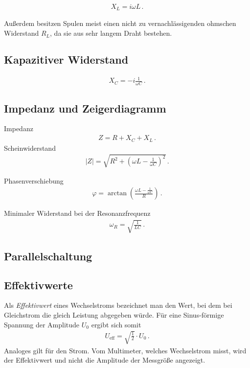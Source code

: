 \documentclass[12pt,a4paper,titlepage,headinclude,bibtotoc]{scrartcl}
\begin{document}
\begin{align}
	X_L=i\omega L \,.
\end{align}

Außerdem besitzen Spulen meist einen nicht zu vernachlässigenden ohmschen Widerstand $R_L$, da sie aus sehr langem Draht bestehen.

\subsection{Kapazitiver Widerstand}

\begin{align}
	X_C=-i\frac{1}{\omega C} \,.
\end{align}

\subsection{Impedanz und Zeigerdiagramm}
Impedanz
\begin{align}
	Z=R+X_C+X_L \,.
\end{align}
Scheinwiderstand
\begin{align}
	|Z|=\sqrt{R^2+\left(\omega L - \frac{1}{\omega C}\right)^2} \,.
\end{align}

Phasenverschiebung
\begin{align}
	\varphi=\arctan\left(\frac{\omega L - \frac{1}{\omega C}}{R} \right) \,.
	\label{eq:phase_serie}
\end{align}

Minimaler Widerstand bei der Resonanzfrequenz
\begin{align}
	\omega_R=\sqrt{\frac{1}{LC}} \,.
\end{align}

\subsection{Parallelschaltung}

\subsection{Effektivwerte}
Als \textit{Effektivwert} eines Wechselstroms bezeichnet man den Wert, bei dem bei Gleichstrom die gleich Leistung abgegeben würde.
Für eine Sinus-förmige Spannung der Amplitude $U_0$ ergibt sich somit
\begin{align}
	U_\text{eff}=\sqrt{\frac{1}{2}}\cdot U_0 \,.
\end{align}
Analoges gilt für den Strom.
Vom Multimeter, welches Wechselstrom misst, wird der Effektivwert und nicht die Amplitude der Messgröße angezeigt.
                                                                                                                                                                      
\end{document}
